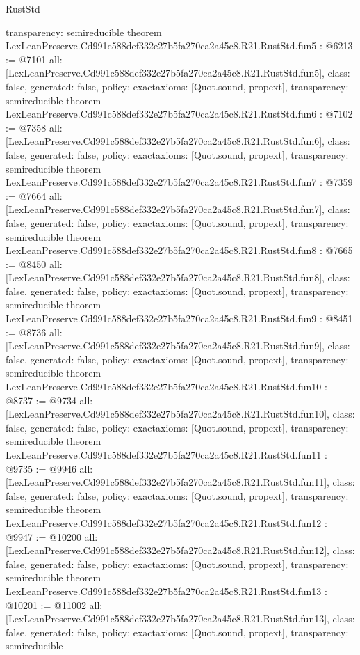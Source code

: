 \begin{lexlean}{RustStd}
\begin{coremodule}
{  transparency: semireducible
}
theorem LexLeanPreserve.Cd991c588def332e27b5fa270ca2a45c8.R21.RustStd.fun5 : @6213 := @7101 {
  all: [LexLeanPreserve.Cd991c588def332e27b5fa270ca2a45c8.R21.RustStd.fun5],
  class: false,
  generated: false,
  policy: exact{axioms: [Quot.sound, propext]},
  transparency: semireducible
}
theorem LexLeanPreserve.Cd991c588def332e27b5fa270ca2a45c8.R21.RustStd.fun6 : @7102 := @7358 {
  all: [LexLeanPreserve.Cd991c588def332e27b5fa270ca2a45c8.R21.RustStd.fun6],
  class: false,
  generated: false,
  policy: exact{axioms: [Quot.sound, propext]},
  transparency: semireducible
}
theorem LexLeanPreserve.Cd991c588def332e27b5fa270ca2a45c8.R21.RustStd.fun7 : @7359 := @7664 {
  all: [LexLeanPreserve.Cd991c588def332e27b5fa270ca2a45c8.R21.RustStd.fun7],
  class: false,
  generated: false,
  policy: exact{axioms: [Quot.sound, propext]},
  transparency: semireducible
}
theorem LexLeanPreserve.Cd991c588def332e27b5fa270ca2a45c8.R21.RustStd.fun8 : @7665 := @8450 {
  all: [LexLeanPreserve.Cd991c588def332e27b5fa270ca2a45c8.R21.RustStd.fun8],
  class: false,
  generated: false,
  policy: exact{axioms: [Quot.sound, propext]},
  transparency: semireducible
}
theorem LexLeanPreserve.Cd991c588def332e27b5fa270ca2a45c8.R21.RustStd.fun9 : @8451 := @8736 {
  all: [LexLeanPreserve.Cd991c588def332e27b5fa270ca2a45c8.R21.RustStd.fun9],
  class: false,
  generated: false,
  policy: exact{axioms: [Quot.sound, propext]},
  transparency: semireducible
}
theorem LexLeanPreserve.Cd991c588def332e27b5fa270ca2a45c8.R21.RustStd.fun10 : @8737 := @9734 {
  all: [LexLeanPreserve.Cd991c588def332e27b5fa270ca2a45c8.R21.RustStd.fun10],
  class: false,
  generated: false,
  policy: exact{axioms: [Quot.sound, propext]},
  transparency: semireducible
}
theorem LexLeanPreserve.Cd991c588def332e27b5fa270ca2a45c8.R21.RustStd.fun11 : @9735 := @9946 {
  all: [LexLeanPreserve.Cd991c588def332e27b5fa270ca2a45c8.R21.RustStd.fun11],
  class: false,
  generated: false,
  policy: exact{axioms: [Quot.sound, propext]},
  transparency: semireducible
}
theorem LexLeanPreserve.Cd991c588def332e27b5fa270ca2a45c8.R21.RustStd.fun12 : @9947 := @10200 {
  all: [LexLeanPreserve.Cd991c588def332e27b5fa270ca2a45c8.R21.RustStd.fun12],
  class: false,
  generated: false,
  policy: exact{axioms: [Quot.sound, propext]},
  transparency: semireducible
}
theorem LexLeanPreserve.Cd991c588def332e27b5fa270ca2a45c8.R21.RustStd.fun13 : @10201 := @11002 {
  all: [LexLeanPreserve.Cd991c588def332e27b5fa270ca2a45c8.R21.RustStd.fun13],
  class: false,
  generated: false,
  policy: exact{axioms: [Quot.sound, propext]},
  transparency: semireducible
}
\end{coremodule}
\end{lexlean}
